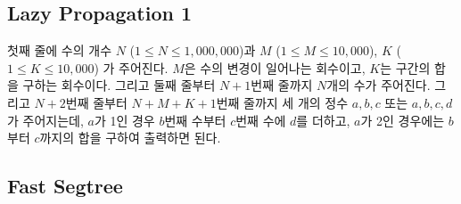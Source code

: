 \documentclass[10pt,landscape,a4paper,twocolumn]{article}
\begin{document}



%
%
%
%
%
%
%
%
%
%
%

\subsection{Lazy Propagation 1}

\textsf{
	첫째 줄에 수의 개수 $ N $ ($ 1 \leq N \leq 1,000,000 $)과 $ M $ ($ 1 \leq M \leq 10,000 $), $ K $ ($ 1 \leq K \leq 10,000 $) 가 주어진다.
	$ M $은 수의 변경이 일어나는 회수이고, $ K $는 구간의 합을 구하는 회수이다.
	그리고 둘째 줄부터 $ N+1 $번째 줄까지 $ N $개의 수가 주어진다.
	그리고 $ N+2 $번째 줄부터 $ N+M+K+1 $번째 줄까지
	세 개의 정수 $ a, b, c $ 또는 $ a, b, c, d $가 주어지는데,
	$ a $가 1인 경우 $ b $번째 수부터 $ c $번째 수에 $ d $를 더하고,
	$ a $가 2인 경우에는 $ b $부터 $ c $까지의 합을 구하여 출력하면 된다.
}




\subsection{Fast Segtree}

\end{document}
